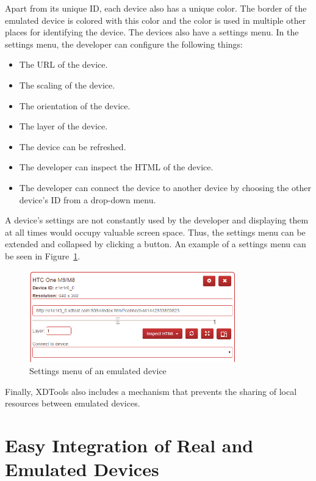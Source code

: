 Apart from its unique ID, each device also has a unique color. The border of the emulated device is colored with this color and the color is used in multiple other places for identifying the device. The devices also have a settings menu. In the settings menu, the developer can configure the following things:
\begin{itemize}
	\item The URL of the device.
	\item The scaling of the device.
	\item The orientation of the device.
	\item The layer of the device. 
	\item The device can be refreshed.
	\item The developer can inspect the HTML of the device.
	\item The developer can connect the device to another device by choosing the other device's ID from a drop-down menu.
\end{itemize}
A device's settings are not constantly used by the developer and displaying them at all times would occupy valuable screen space. Thus, the settings menu can be extended and collapsed by clicking a button. An example of a settings menu can be seen in Figure~\ref{fig:settings_menu}. 

\begin{figure}[H]
  \centering
    \includegraphics[width=0.8\textwidth]{images/screenshots/settings_menu_2.png}
	\caption[Screenshot: Settings menu emulated device]{Settings menu of an emulated device}
	\label{fig:settings_menu}
\end{figure}

Finally, XDTools also includes a mechanism that prevents the sharing of local resources between emulated devices.
 
\section{Easy Integration of Real and Emulated Devices}

